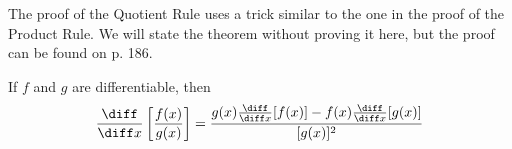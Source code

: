 \begin{frame}
The proof of the Quotient Rule uses a trick similar to the one in the proof of the Product Rule.  We will state the theorem without proving it here, but the proof can be found on p. 186.
\begin{theorem}
If $f$ and $g$ are differentiable, then
\[
\frac{\diff}{\diff x} \left[ \frac{f(x)}{g(x)}\right] = \frac{g(x)\frac{\diff}{\diff x} [f(x)] - f(x) \frac{\diff}{\diff x}[g(x)]}{[g(x)]^2}
\]
\end{theorem}
\end{frame}
